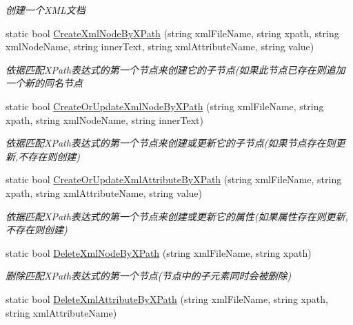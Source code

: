 \begin{DoxyCompactItemize}
\begin{DoxyCompactList}\small\item\em 创建一个\+X\+M\+L文档 \end{DoxyCompactList}\item 
static bool \hyperlink{class_x_c_l_net_tools_1_1_x_m_l_1_1_x_m_l_helper_a64172ca2312a41b7b64a31e3585e8bda}{Create\+Xml\+Node\+By\+X\+Path} (string xml\+File\+Name, string xpath, string xml\+Node\+Name, string inner\+Text, string xml\+Attribute\+Name, string value)
\begin{DoxyCompactList}\small\item\em 依据匹配\+X\+Path表达式的第一个节点来创建它的子节点(如果此节点已存在则追加一个新的同名节点 \end{DoxyCompactList}\item 
static bool \hyperlink{class_x_c_l_net_tools_1_1_x_m_l_1_1_x_m_l_helper_a770d2342df55e3a414830e1d1842dea8}{Create\+Or\+Update\+Xml\+Node\+By\+X\+Path} (string xml\+File\+Name, string xpath, string xml\+Node\+Name, string inner\+Text)
\begin{DoxyCompactList}\small\item\em 依据匹配\+X\+Path表达式的第一个节点来创建或更新它的子节点(如果节点存在则更新,不存在则创建) \end{DoxyCompactList}\item 
static bool \hyperlink{class_x_c_l_net_tools_1_1_x_m_l_1_1_x_m_l_helper_af784efe901d3b7ee6d6ffbcb2711f489}{Create\+Or\+Update\+Xml\+Attribute\+By\+X\+Path} (string xml\+File\+Name, string xpath, string xml\+Attribute\+Name, string value)
\begin{DoxyCompactList}\small\item\em 依据匹配\+X\+Path表达式的第一个节点来创建或更新它的属性(如果属性存在则更新,不存在则创建) \end{DoxyCompactList}\item 
static bool \hyperlink{class_x_c_l_net_tools_1_1_x_m_l_1_1_x_m_l_helper_a715f1e4b7ef5d9626ca4e1c7bd3ae460}{Delete\+Xml\+Node\+By\+X\+Path} (string xml\+File\+Name, string xpath)
\begin{DoxyCompactList}\small\item\em 删除匹配\+X\+Path表达式的第一个节点(节点中的子元素同时会被删除) \end{DoxyCompactList}\item 
static bool \hyperlink{class_x_c_l_net_tools_1_1_x_m_l_1_1_x_m_l_helper_a8907224fc217566b279babdbc2b14716}{Delete\+Xml\+Attribute\+By\+X\+Path} (string xml\+File\+Name, string xpath, string xml\+Attribute\+Name)

\end{DoxyCompactItemize}
